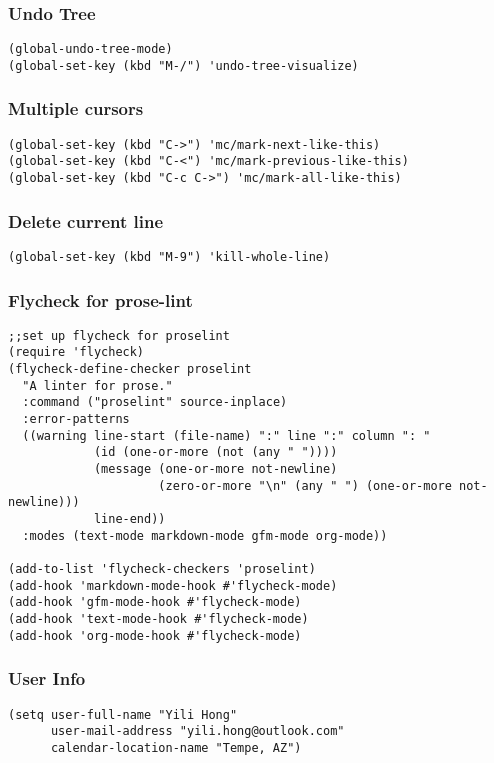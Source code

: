\documentclass[11pt]{article}
\begin{document}
\subsubsection{Undo Tree}
\label{sec:orgheadline14}
\begin{verbatim}
(global-undo-tree-mode)
(global-set-key (kbd "M-/") 'undo-tree-visualize)
\end{verbatim}
\subsubsection{Multiple cursors}
\label{sec:orgheadline15}
\begin{verbatim}
(global-set-key (kbd "C->") 'mc/mark-next-like-this)
(global-set-key (kbd "C-<") 'mc/mark-previous-like-this)
(global-set-key (kbd "C-c C->") 'mc/mark-all-like-this)
\end{verbatim}
\subsubsection{Delete current line}
\label{sec:orgheadline16}
\begin{verbatim}
(global-set-key (kbd "M-9") 'kill-whole-line)
\end{verbatim}
\subsubsection{Flycheck for prose-lint}
\label{sec:orgheadline17}
\begin{verbatim}
;;set up flycheck for proselint
(require 'flycheck)
(flycheck-define-checker proselint
  "A linter for prose."
  :command ("proselint" source-inplace)
  :error-patterns
  ((warning line-start (file-name) ":" line ":" column ": "
            (id (one-or-more (not (any " "))))
            (message (one-or-more not-newline)
                     (zero-or-more "\n" (any " ") (one-or-more not-newline)))
            line-end))
  :modes (text-mode markdown-mode gfm-mode org-mode))

(add-to-list 'flycheck-checkers 'proselint)
(add-hook 'markdown-mode-hook #'flycheck-mode)
(add-hook 'gfm-mode-hook #'flycheck-mode)
(add-hook 'text-mode-hook #'flycheck-mode)
(add-hook 'org-mode-hook #'flycheck-mode)
\end{verbatim}
\subsubsection{User Info}
\label{sec:orgheadline18}
\begin{verbatim}
(setq user-full-name "Yili Hong"
      user-mail-address "yili.hong@outlook.com"
      calendar-location-name "Tempe, AZ")
\end{verbatim}
\end{document}
